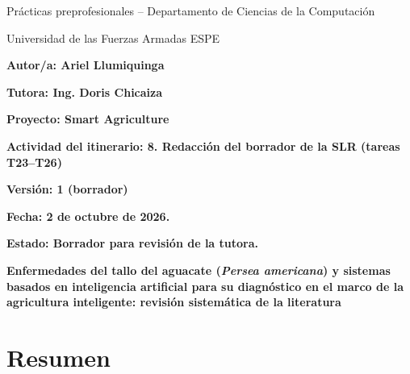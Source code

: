 \documentclass[11pt]{article}
\begin{document}
\justifying
\begingroup\setlength{\parskip}{0pt}

{\centering Prácticas preprofesionales – Departamento de Ciencias de la Computación\par}

{\centering \hangindent=0.635cm Universidad de las Fuerzas Armadas ESPE\par}

\noindent\hangindent=0.635cm  \textbf{Autor/a: Ariel Llumiquinga}\par

\noindent\hangindent=0.635cm  \textbf{Tutora: Ing. Doris Chicaiza}\par

\noindent\hangindent=0.635cm  \textbf{Proyecto: Smart Agriculture}\par

\noindent\hangindent=0.635cm  \textbf{Actividad del itinerario: 8. Redacción del borrador de la SLR (tareas T23–T26)}\par

\noindent\hangindent=0.635cm  \textbf{Versión: 1 (borrador)}\par

\noindent\hangindent=0.635cm  \textbf{Fecha: 2 de octubre de 2026.}\par

\noindent\hangindent=0.635cm  \textbf{Estado: Borrador para revisión de la tutora.}\par

\endgroup

\vspace*{\baselineskip}

\vspace{6pt}

{\centering\fontsize{14}{17}\selectfont \textbf{Enfermedades del tallo del aguacate (}\textbf{\textit{Persea americana}}\textbf{) y sistemas basados en inteligencia artificial para su diagnóstico en el marco de la agricultura inteligente: revisión sistemática de la literatura}\par}

\vspace{2pt}

\section*{Resumen}
\end{document}
